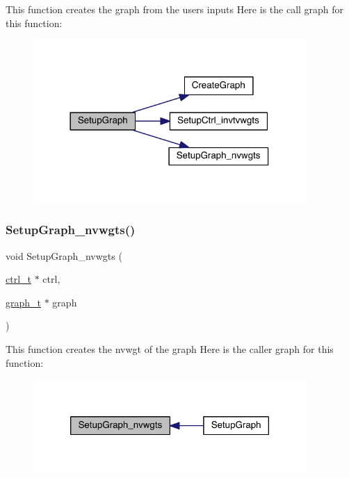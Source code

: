 This function creates the graph from the user\textquotesingle{}s inputs Here is the call graph for this function\+:\nopagebreak
\begin{figure}[H]
\begin{center}
\leavevmode
\includegraphics[width=294pt]{a00951_a010e2ad3dd68ae816d481fdcd4260583_cgraph}
\end{center}
\end{figure}
\mbox{\label{a00951_adc4ae6f6575afd6ae777f535ea8c439f}} 
\subsubsection{\texorpdfstring{Setup\+Graph\+\_\+nvwgts()}{SetupGraph\_nvwgts()}}
{\footnotesize\ttfamily void Setup\+Graph\+\_\+nvwgts (\begin{DoxyParamCaption}\item[{\hyperlink{a00742}{ctrl\+\_\+t} $\ast$}]{ctrl,  }\item[{\hyperlink{a00734}{graph\+\_\+t} $\ast$}]{graph }\end{DoxyParamCaption})}

This function creates the nvwgt of the graph Here is the caller graph for this function\+:\nopagebreak
\begin{figure}[H]
\begin{center}
\leavevmode
\includegraphics[width=294pt]{a00951_adc4ae6f6575afd6ae777f535ea8c439f_icgraph}
\end{center}
\end{figure}
\mbox{\label{a00951_a9f9b575b1270719a1d7ae34f89ed2dc5}} 
